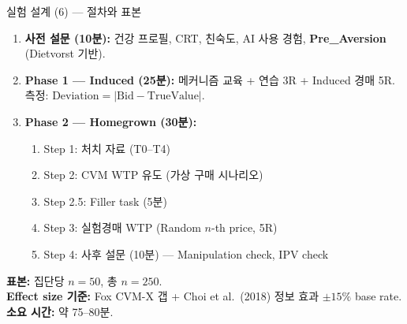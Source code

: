 \documentclass[aspectratio=169]{beamer}
\begin{document}
\begin{frame}{실험 설계 (6) --- 절차와 표본}
  \footnotesize
  \begin{enumerate}\itemsep0.15em
    \item \textbf{사전 설문 (10분):} 건강 프로필, CRT, 친숙도, AI 사용 경험, \textbf{Pre\_Aversion} (Dietvorst 기반).
    \item \textbf{Phase 1 --- Induced (25분):} 메커니즘 교육 + 연습 3R + Induced 경매 5R.\\
      \quad 측정: $\mathrm{Deviation} = |\mathrm{Bid} - \mathrm{TrueValue}|$.
    \item \textbf{Phase 2 --- Homegrown (30분):}
      \begin{enumerate}\itemsep0.05em
        \item Step 1: 처치 자료 (T0--T4)
        \item Step 2: CVM WTP 유도 (가상 구매 시나리오)
        \item Step 2.5: Filler task (5분)
        \item Step 3: 실험경매 WTP (Random $n$-th price, 5R)
        \item Step 4: 사후 설문 (10분) --- Manipulation check, IPV check
      \end{enumerate}
  \end{enumerate}

  \vspace{0.3em}
  \small
  \textbf{표본:} 집단당 $n = 50$, 총 $n = 250$.\\
  \textbf{Effect size 기준:} Fox CVM-X 갭 + Choi et al.\ (2018) 정보 효과 $\pm 15\%$ base rate.\\
  \textbf{소요 시간:} 약 75--80분.
\end{frame}

\end{document}
